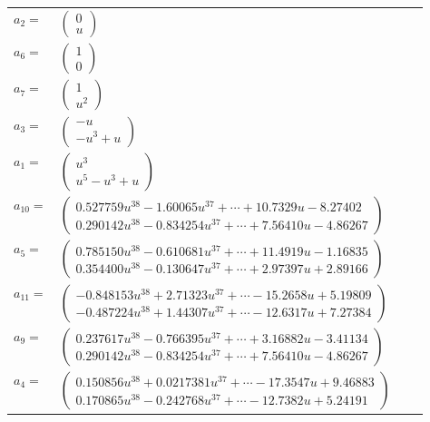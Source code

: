 \documentclass[1p]{elsarticle_modified}
\theoremstyle{definition}
\begin{document}
\begin{tabular}{m{7pt} m{180pt} m{7pt} m{180pt} }
\flushright $a_{2}=$&$\begin{pmatrix}0\\u\end{pmatrix}$ \\
\flushright $a_{6}=$&$\begin{pmatrix}1\\0\end{pmatrix}$ \\
\flushright $a_{7}=$&$\begin{pmatrix}1\\u^2\end{pmatrix}$ \\
\flushright $a_{3}=$&$\begin{pmatrix}- u\\- u^3+u\end{pmatrix}$ \\
\flushright $a_{1}=$&$\begin{pmatrix}u^3\\u^5- u^3+u\end{pmatrix}$ \\
\flushright $a_{10}=$&$\begin{pmatrix}0.527759 u^{38}-1.60065 u^{37}+\cdots+10.7329 u-8.27402\\0.290142 u^{38}-0.834254 u^{37}+\cdots+7.56410 u-4.86267\end{pmatrix}$ \\
\flushright $a_{5}=$&$\begin{pmatrix}0.785150 u^{38}-0.610681 u^{37}+\cdots+11.4919 u-1.16835\\0.354400 u^{38}-0.130647 u^{37}+\cdots+2.97397 u+2.89166\end{pmatrix}$ \\
\flushright $a_{11}=$&$\begin{pmatrix}-0.848153 u^{38}+2.71323 u^{37}+\cdots-15.2658 u+5.19809\\-0.487224 u^{38}+1.44307 u^{37}+\cdots-12.6317 u+7.27384\end{pmatrix}$ \\
\flushright $a_{9}=$&$\begin{pmatrix}0.237617 u^{38}-0.766395 u^{37}+\cdots+3.16882 u-3.41134\\0.290142 u^{38}-0.834254 u^{37}+\cdots+7.56410 u-4.86267\end{pmatrix}$ \\
\flushright $a_{4}=$&$\begin{pmatrix}0.150856 u^{38}+0.0217381 u^{37}+\cdots-17.3547 u+9.46883\\0.170865 u^{38}-0.242768 u^{37}+\cdots-12.7382 u+5.24191\end{pmatrix}$ \\

\end{tabular}
\end{document}
